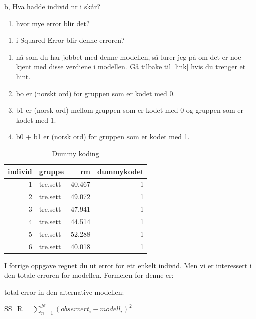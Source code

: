 \documentclass[
]{book}
\providecommand{\tightlist}{%
  \setlength{\itemsep}{0pt}\setlength{\parskip}{0pt}}
\begin{document}
b, Hva hadde individ nr i skår?

\begin{enumerate}
\def\labelenumi{\alph{enumi}.}
\setcounter{enumi}{2}
\tightlist
\item
  hvor mye error blir det?
\end{enumerate}

\begin{enumerate}
\def\labelenumi{\alph{enumi}.}
\setcounter{enumi}{3}
\tightlist
\item
  i Squared Error blir denne erroren?
\end{enumerate}

\begin{enumerate}
\def\labelenumi{\alph{enumi}.}
\setcounter{enumi}{4}
\item
  nå som du har jobbet med denne modellen, så lurer jeg på om det er noe kjent med disse verdiene i modellen. Gå tilbake til {[}link{]} hvis du trenger et hint.
\item
  bo er (norskt ord) for gruppen som er kodet med 0.
\item
  b1 er (norsk ord) mellom gruppen som er kodet med 0 og gruppen som er kodet med 1.
\item
  b0 + b1 er (norsk ord) for gruppen som er kodet med 1.
\end{enumerate}

\begin{table}

\caption{\label{tab:unnamed-chunk-11}Dummy koding}
\centering
\begin{tabular}[t]{r|l|r|r}
\hline
individ & gruppe & rm & dummykodet\\
\hline
1 & tre.sett & 40.467 & 1\\
\hline
2 & tre.sett & 49.072 & 1\\
\hline
3 & tre.sett & 47.941 & 1\\
\hline
4 & tre.sett & 44.514 & 1\\
\hline
5 & tre.sett & 52.288 & 1\\
\hline
6 & tre.sett & 40.018 & 1\\
\hline
\end{tabular}
\end{table}

I forrige oppgave regnet du ut error for ett enkelt individ. Men vi er interessert i den totale erroren for modellen. Formelen for denne er:

total error in den alternative modellen:

SS\_R = \(\sum_{n=1}^N (observert_i - modell_i)^2\)
\end{document}
